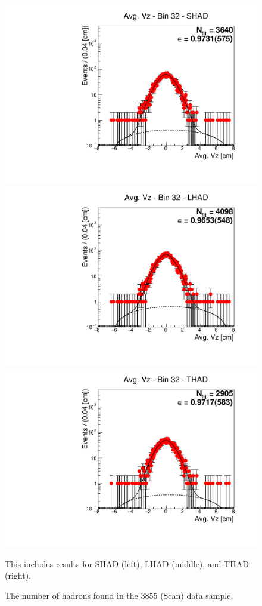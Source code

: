 \begin{figure}[H]
\centering
\includegraphics[scale=0.25]{figures/plots/nonDDbar_fit_results/scan/fit_scan_32_data_SHAD.pdf}
\hspace{-0.5cm}
\includegraphics[scale=0.25]{figures/plots/nonDDbar_fit_results/scan/fit_scan_32_data_LHAD.pdf}
\hspace{-0.5cm}
\includegraphics[scale=0.25]{figures/plots/nonDDbar_fit_results/scan/fit_scan_32_data_THAD.pdf}
\caption{The number of hadrons found in the 3855 (Scan) data sample.}
{This includes results for SHAD (left), LHAD (middle), and THAD (right).}
\label{fig:hadron_fits_scan_32}
\end{figure}

